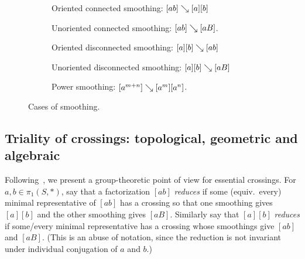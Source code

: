 \begin{figure}[ht]
\centering
\begin{subfigure}{0.18\textwidth}
\centering
{}
\caption{Oriented connected smoothing: $[ab] \mathrel{\searrow} [a][b]$}
\label{fig:sm_oriented_connected}
\end{subfigure}
\hfill
\begin{subfigure}{0.18\textwidth}
\centering
{}
\caption{Unoriented connected smoothing: $[ab]\mathrel{\searrow}[aB]$.}
\label{fig:sm_unoriented_connected}
\end{subfigure}
\hfill
\begin{subfigure}{0.18\textwidth}
\centering
{}
\caption{Oriented disconnected smoothing: $[a][b]\mathrel{\searrow} [ab]$}
\label{fig:sm_oriented_disconnected}
\end{subfigure}
\hfill
\begin{subfigure}{0.18\textwidth}
\centering
{}
\caption{Unoriented disconnected smoothing: $[a][b]\mathrel{\searrow} [aB]$}
\label{fig:sm_unoriented_disconnected}
\end{subfigure}
\hfill
\begin{subfigure}{0.18\textwidth}
\centering
{}
\caption{Power smoothing: $[a^{m+n}]\mathrel{\searrow}[a^m][a^n]$.}
\label{fig:sm_power}
\end{subfigure}
\caption{Cases of smoothing.}
\label{fig:cases--sm}
\end{figure}

\subsection{Triality of crossings: topological, geometric and algebraic}
\label{subsec:triality}
Following~\cite{MGT25:SmoothingsErratum}, we present a group-theoretic point of view for essential crossings. For $a,b \in \pi_1(S,*)$, say that a
factorization $[ab]$ \emph{reduces} if some (equiv.\ every) minimal
representative of $[ab]$ has a crossing so that one smoothing gives
$[a][b]$ and the other smoothing gives $[aB]$. Similarly say that
$[a][b]$ \emph{reduces} if some/every minimal representative has a crossing
whose smoothings give $[ab]$ and $[aB]$. (This is an abuse of
notation, since the reduction is not invariant under individual
conjugation of $a$ and $b$.)

